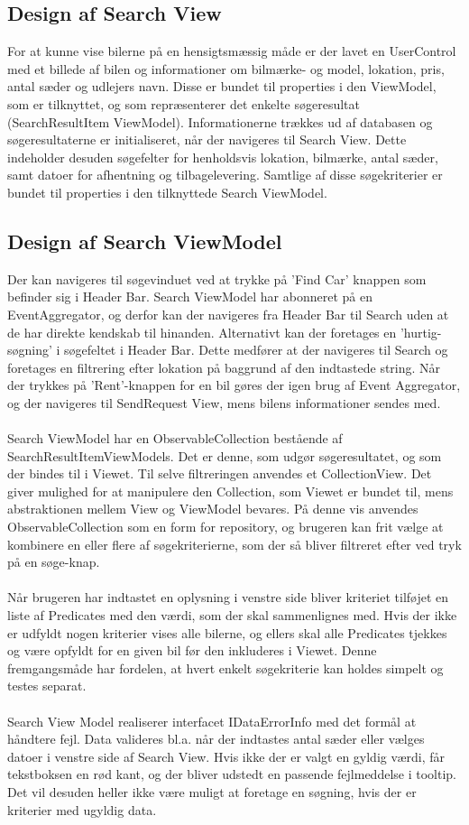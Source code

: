\documentclass[SoftwareDesign/SoftwareDesign_main.tex]{subfiles}
\begin{document}
\subsection{Design af Search View}
For at kunne vise bilerne på en hensigtsmæssig måde er der lavet en UserControl med et billede af bilen og informationer om bilmærke- og model, lokation, pris, antal sæder og udlejers navn. Disse er bundet til properties i den ViewModel, som er tilknyttet, og som repræsenterer det enkelte søgeresultat (SearchResultItem ViewModel). Informationerne trækkes ud af databasen og søgeresultaterne er initialiseret, når der navigeres til Search View. Dette indeholder desuden søgefelter for henholdsvis lokation, bilmærke, antal sæder, samt datoer for afhentning og tilbagelevering. Samtlige af disse søgekriterier er bundet til properties i den tilknyttede Search ViewModel.

\subsection{Design af Search ViewModel}
Der kan navigeres til søgevinduet ved at trykke på 'Find Car' knappen som befinder sig i Header Bar. Search ViewModel har abonneret på en EventAggregator, og derfor kan der navigeres fra Header Bar til Search uden at de har direkte kendskab til hinanden. Alternativt kan der foretages en 'hurtig-søgning' i søgefeltet i Header Bar. Dette medfører at der navigeres til Search og foretages en filtrering efter lokation på baggrund af den indtastede string. Når der trykkes på 'Rent'-knappen for en bil gøres der igen brug af Event Aggregator, og der navigeres til SendRequest View, mens bilens informationer sendes med. \\\\Search ViewModel har en ObservableCollection bestående af SearchResultItemViewModels. Det er denne, som udgør søgeresultatet, og som der bindes til i Viewet. Til selve filtreringen anvendes et CollectionView. Det giver mulighed for at manipulere den Collection, som Viewet er bundet til, mens abstraktionen mellem View og ViewModel bevares. På denne vis anvendes ObservableCollection som en form for repository, og brugeren kan frit vælge at kombinere en eller flere af søgekriterierne, som der så bliver filtreret efter ved tryk på en søge-knap. \\\\Når brugeren har indtastet en oplysning i venstre side bliver kriteriet tilføjet en liste af Predicates med den værdi, som der skal sammenlignes med. Hvis der ikke er udfyldt nogen kriterier vises alle bilerne, og ellers skal alle Predicates tjekkes og være opfyldt for en given bil før den inkluderes i Viewet. Denne fremgangsmåde har fordelen, at hvert enkelt søgekriterie kan holdes simpelt og testes separat. \\\\Search View Model realiserer interfacet IDataErrorInfo med det formål at håndtere fejl. Data valideres bl.a. når der indtastes antal sæder eller vælges datoer i venstre side af Search View. Hvis ikke der er valgt en gyldig værdi, får tekstboksen en rød kant, og der bliver udstedt en passende fejlmeddelse i tooltip. Det vil desuden heller ikke være muligt at foretage en søgning, hvis der er kriterier med ugyldig data.
\end{document}
